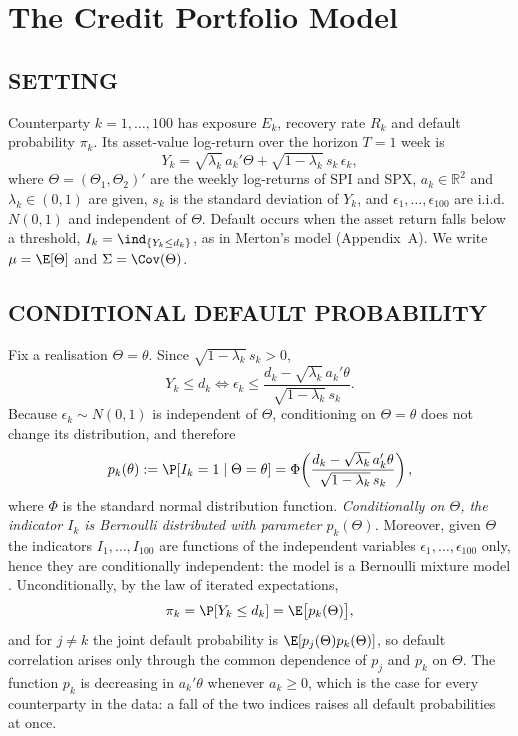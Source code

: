 \section{The Credit Portfolio Model}
\label{sec:model}

\subsection{SETTING}
Counterparty $k=1,\dots,100$ has exposure $E_k$, recovery rate $R_k$ and default probability $\pi_k$. Its asset-value log-return over the horizon $T=1$ week is
\begin{equation}
\label{eq:Yk}
Y_k = \sqrt{\lambda_k}\, a_k'\Theta + \sqrt{1-\lambda_k}\, s_k\, \epsilon_k ,
\end{equation}
where $\Theta=(\Theta_1,\Theta_2)'$ are the weekly log-returns of SPI and SPX, $a_k\in\mathbb{R}^2$ and $\lambda_k\in(0,1)$ are given, $s_k$ is the standard deviation of $Y_k$, and $\epsilon_1,\dots,\epsilon_{100}$ are i.i.d.\ $N(0,1)$ and independent of $\Theta$. Default occurs when the asset return falls below a threshold, $I_k=\ind_{\{Y_k\le d_k\}}$, as in Merton's model (Appendix~A). We write $\mu=\E[\Theta]$ and $\Sigma=\Cov(\Theta)$.

\subsection{CONDITIONAL DEFAULT PROBABILITY}
\label{subsec:condpd}
Fix a realisation $\Theta=\theta$. Since $\sqrt{1-\lambda_k}\,s_k>0$,
\[
Y_k\le d_k \iff \epsilon_k \le \frac{d_k-\sqrt{\lambda_k}\,a_k'\theta}{\sqrt{1-\lambda_k}\,s_k}.
\]
Because $\epsilon_k\sim N(0,1)$ is independent of $\Theta$, conditioning on $\Theta=\theta$ does not change its distribution, and therefore
\begin{equation}
\label{eq:condpd}
p_k(\theta) := \P[I_k=1\mid \Theta=\theta] = \Phi\!\left(\frac{d_k-\sqrt{\lambda_k}\,a_k'\theta}{\sqrt{1-\lambda_k}\,s_k}\right),
\end{equation}
where $\Phi$ is the standard normal distribution function. \emph{Conditionally on $\Theta$, the indicator $I_k$ is Bernoulli distributed with parameter $p_k(\Theta)$.} Moreover, given $\Theta$ the indicators $I_1,\dots,I_{100}$ are functions of the independent variables $\epsilon_1,\dots,\epsilon_{100}$ only, hence they are conditionally independent: the model is a Bernoulli mixture model \citep[Sect.~8.4]{McNeil05}. Unconditionally, by the law of iterated expectations,
\begin{equation}
\label{eq:uncond}
\pi_k=\P[Y_k\le d_k]=\E\big[p_k(\Theta)\big],
\end{equation}
and for $j\neq k$ the joint default probability is $\E[p_j(\Theta)p_k(\Theta)]$, so default correlation arises only through the common dependence of $p_j$ and $p_k$ on $\Theta$. The function $p_k$ is decreasing in $a_k'\theta$ whenever $a_k\ge 0$, which is the case for every counterparty in the data: a fall of the two indices raises all default probabilities at once.

